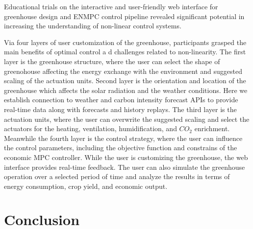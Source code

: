 \documentclass[conference]{IEEEtran}
\begin{document}
Educational trials on the interactive and user-friendly web interface for greenhouse design and ENMPC control pipeline revealed significant potential in increasing the understanding of non-linear control systems. 

Via four layers of user customization of the greenhouse, participants grasped the main benefits of optimal control a d challenges related to non-linearity. The first layer is the greenhouse structure, where the user can select the shape of greenohouse affecting the energy exchange with the environment and suggested scaling of the actuation units. Second layer is the orientation and location of the greenhouse which affects the solar radiation and the weather conditions. Here we establish connection to weather and carbon intensity forecast APIs to provide real-time data along with forecasts and history replays. The third layer is the actuation units, where the user can overwrite the suggested scaling and select the actuators for the heating, ventilation, humidification, and \(CO_2\) enrichment. Meanwhile the fourth layer is the control strategy, where the user can influence the control parameters, including the objective function and constrains of the economic MPC controller. While the user is customizing the greenhouse, the web interface provides real-time feedback. The user can also simulate the greenhouse operation over a selected period of time and analyze the results in terms of energy consumption, crop yield, and economic output.

\section{Conclusion}



\end{document}
